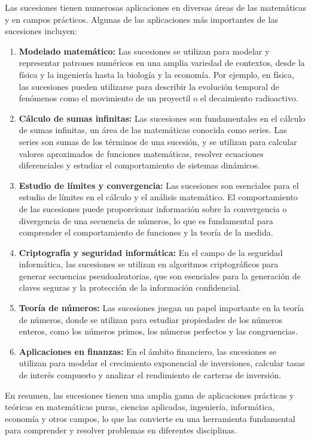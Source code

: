 Las sucesiones tienen numerosas aplicaciones en diversas áreas de las matemáticas y en campos prácticos. Algunas de las aplicaciones más importantes de las sucesiones incluyen:

\begin{enumerate}
	\item \textbf{Modelado matemático:} Las sucesiones se utilizan para modelar y representar patrones numéricos en una amplia variedad de contextos, desde la física y la ingeniería hasta la biología y la economía. Por ejemplo, en física, las sucesiones pueden utilizarse para describir la evolución temporal de fenómenos como el movimiento de un proyectil o el decaimiento radioactivo.
	\item \textbf{Cálculo de sumas infinitas:} Las sucesiones son fundamentales en el cálculo de sumas infinitas, un área de las matemáticas conocida como series. Las series son sumas de los términos de una sucesión, y se utilizan para calcular valores aproximados de funciones matemáticas, resolver ecuaciones diferenciales y estudiar el comportamiento de sistemas dinámicos. 
	\item \textbf{Estudio de límites y convergencia:} Las sucesiones son esenciales para el estudio de límites en el cálculo y el análisis matemático. El comportamiento de las sucesiones puede proporcionar información sobre la convergencia o divergencia de una secuencia de números, lo que es fundamental para comprender el comportamiento de funciones y la teoría de la medida.
	\item \textbf{Criptografía y seguridad informática:} En el campo de la seguridad informática, las sucesiones se utilizan en algoritmos criptográficos para generar secuencias pseudoaleatorias, que son esenciales para la generación de claves seguras y la protección de la información confidencial.
	\item \textbf{Teoría de números:} Las sucesiones juegan un papel importante en la teoría de números, donde se utilizan para estudiar propiedades de los números enteros, como los números primos, los números perfectos y las congruencias.
	\item \textbf{Aplicaciones en finanzas:} En el ámbito financiero, las sucesiones se utilizan para modelar el crecimiento exponencial de inversiones, calcular tasas de interés compuesto y analizar el rendimiento de carteras de inversión.
\end{enumerate}

En resumen, las sucesiones tienen una amplia gama de aplicaciones prácticas y teóricas en matemáticas puras, ciencias aplicadas, ingeniería, informática, economía y otros campos, lo que las convierte en una herramienta fundamental para comprender y resolver problemas en diferentes disciplinas.